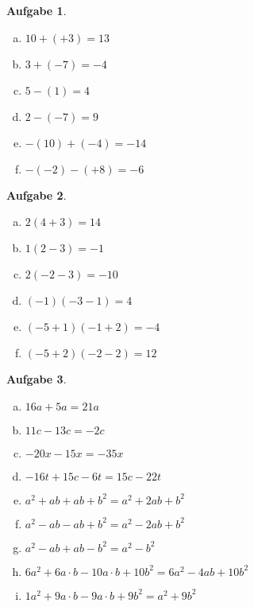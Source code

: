 \documentclass[12pt,fleqn]{article}
\theoremstyle{aufg}
\newtheorem{aufgabe}{Aufgabe}
\theoremstyle{bsp}
\begin{document}
 
    \begin{flushleft}
\begin{center}\end{center}\begin{aufgabe} ~ \\ 
\begin{multicols}{3} 
\begin{enumerate}[a)] 
\item 
$10+(+3)=13$
\item 
$3+(-7)=-4$
\item 
$5-(1)=4$
\item 
$2-(-7)=9$
\item 
$-(10)+(-4)=-14$
\item 
$-(-2)-(+8)=-6$
\end{enumerate} 
\end{multicols} 
\end{aufgabe} 
\begin{aufgabe} ~ \\ 
\begin{multicols}{3} 
\begin{enumerate}[a)] 
\item 
$2(4+3)=14$
\item 
$1(2-3)=-1$
\item 
$2(-2-3)=-10$
\item 
$(-1)(-3-1)=4$
\item 
$(-5+1)(-1+2)=-4$
\item 
$(-5+2)(-2-2)=12$
\end{enumerate} 
\end{multicols} 
\end{aufgabe} 
\begin{aufgabe} ~ \\ 
\begin{multicols}{2} 
\begin{enumerate}[a)] 
\item 
$16a+5a=21 a$
\item 
$11c-13c=- 2 c$
\item 
$-20x-15x=- 35 x$
\item 
$-16t+15c-6t=15 c - 22 t$
\item 
$a^2+ab+ab+b^2=a^{2} + 2 a b + b^{2}$
\item 
$a^2-ab-ab+b^2=a^{2} - 2 a b + b^{2}$
\item 
$a^2-ab+ab-b^2=a^{2} - b^{2}$
\item 
$6a^2+6a\cdot b-10a\cdot b+10b^2=6 a^{2} - 4 a b + 10 b^{2}$
\item 
$1a^2+9a\cdot b-9a\cdot b+9b^2=a^{2} + 9 b^{2}$

\end{enumerate}
\end{multicols}
\end{aufgabe}
\end{flushleft}
\end{document}
